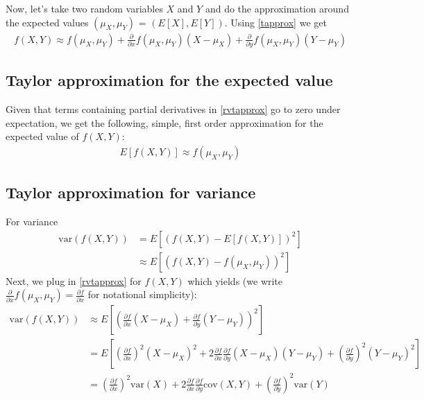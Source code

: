 \documentclass{article}
\begin{document}
Now, let's take two random variables $X$ and $Y$ and do the approximation around the expected values $(\mu_X, \mu_Y)$ = $(E[X], E[Y])$. Using \eqref{tapprox} we get
\begin{align}
    f(X, Y) \approx f(\mu_X, \mu_Y) + \frac{\partial }{\partial x} f(\mu_X, \mu_Y) (X - \mu_X) + \frac{\partial }{\partial y} f(\mu_X, \mu_Y) (Y - \mu_Y) \label{rvtapprox}
\end{align}

\subsection{Taylor approximation for the expected value}
Given that terms containing partial derivatives in \eqref{rvtapprox} go to zero under expectation, we get the following, simple, first order approximation for the expected value of $f(X, Y)$:
\begin{align}
    E[f(X, Y)] \approx f(\mu_X, \mu_Y) \label{eapprox}
\end{align}

\subsection{Taylor approximation for variance}
For variance
\begin{align}
    \text{var}(f(X, Y)) &= E\left[ \left(f(X, Y) - E[f(X,Y)] \right)^2 \right] \nonumber \\
    &\approx E\left[ \left( f(X, Y) - f(\mu_X, \mu_Y) \right)^2 \right] \nonumber
\end{align}
Next, we plug in \eqref{rvtapprox} for $f(X,Y)$ which yields (we write $\frac{\partial }{\partial x} f(\mu_X, \mu_Y) = \frac{\partial f}{\partial x}$ for notational simplicity):
\begin{align}
    \text{var}(f(X, Y)) &\approx E\left[ \left( \frac{\partial f}{\partial x} (X - \mu_X) + \frac{\partial f}{\partial y} (Y - \mu_Y) \right)^2 \right] \nonumber \\
    &= E\left[ \left( \frac{\partial f}{\partial x}  \right)^2 (X - \mu_X)^2 + 2 \frac{\partial f}{\partial x} \frac{\partial f}{\partial y} (X - \mu_X)(Y - \mu_Y) + \left( \frac{\partial f}{\partial y}  \right)^2 (Y - \mu_Y)^2  \right] \nonumber \\
    &= \left( \frac{\partial f}{\partial x}  \right)^2 \text{var}(X) + 2 \frac{\partial f}{\partial x} \frac{\partial f}{\partial y} \text{cov}(X, Y) + \left( \frac{\partial f}{\partial y}  \right)^2 \text{var}(Y) \label{varapprox}
\end{align}
\end{document}
